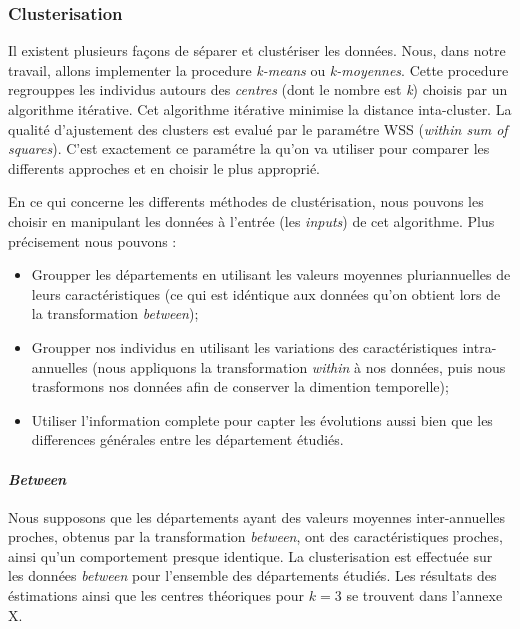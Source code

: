 \documentclass[11pt,]{article}
\providecommand{\tightlist}{%
  \setlength{\itemsep}{0pt}\setlength{\parskip}{0pt}}
\let\oldparagraph\paragraph
\renewcommand{\paragraph}[1]{\oldparagraph{#1}\mbox{}}
\begin{document}
\hypertarget{clusterisation}{%
\subsubsection{Clusterisation}\label{clusterisation}}

Il existent plusieurs façons de séparer et clustériser les données.
Nous, dans notre travail, allons implementer la procedure \emph{k-means}
ou \emph{k-moyennes}. Cette procedure regrouppes les individus autours
des \emph{centres} (dont le nombre est \emph{k}) choisis par un
algorithme itérative. Cet algorithme itérative minimise la distance
inta-cluster. La qualité d'ajustement des clusters est evalué par le
paramétre WSS (\emph{within sum of squares}). C'est exactement ce
paramétre la qu'on va utiliser pour comparer les differents approches et
en choisir le plus approprié.

En ce qui concerne les differents méthodes de clustérisation, nous
pouvons les choisir en manipulant les données à l'entrée (les
\emph{inputs}) de cet algorithme. Plus précisement nous pouvons :

\begin{itemize}
\tightlist
\item
  Groupper les départements en utilisant les valeurs moyennes
  pluriannuelles de leurs caractéristiques (ce qui est idéntique aux
  données qu'on obtient lors de la transformation \emph{between});
\item
  Groupper nos individus en utilisant les variations des
  caractéristiques intra-annuelles (nous appliquons la transformation
  \emph{within} à nos données, puis nous trasformons nos données afin de
  conserver la dimention temporelle);
\item
  Utiliser l'information complete pour capter les évolutions aussi bien
  que les differences générales entre les département étudiés.
\end{itemize}

\hypertarget{between}{%
\paragraph{\texorpdfstring{\emph{Between}}{Between}}\label{between}}

Nous supposons que les départements ayant des valeurs moyennes
inter-annuelles proches, obtenus par la transformation \emph{between},
ont des caractéristiques proches, ainsi qu'un comportement presque
identique. La clusterisation est effectuée sur les données
\emph{between} pour l'ensemble des départements étudiés. Les résultats
des éstimations ainsi que les centres théoriques pour \(k = 3\) se
trouvent dans l'annexe X.
\end{document}
